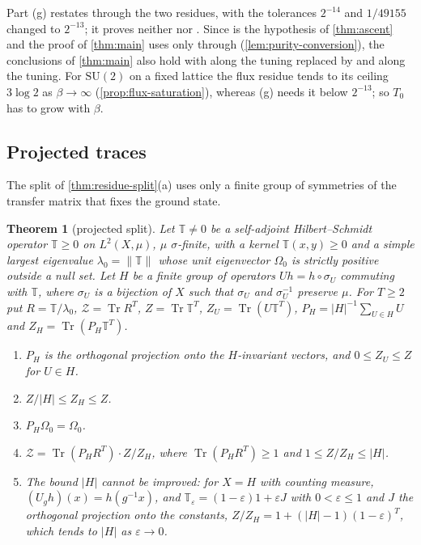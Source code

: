 \documentclass[11pt,a4paper]{amsart}
\newtheorem{theorem}{Theorem}[section]
\theoremstyle{definition}
\theoremstyle{remark}
\numberwithin{equation}{section}
\DeclareMathOperator{\Tr}{Tr}        %
\newcommand{\norm}[1]{\lVert #1\rVert}     %
\newcommand{\abs}[1]{\lvert #1\rvert}      %
\newcommand{\SU}{\mathrm{SU}}              %
\newcommand{\TT}{\mathbb{T}}               %
\newcommand{\Zc}{\mathcal{Z}}              %
\newcommand{\lzero}{\lambda_0}             %
\newcommand{\Omegazero}{\Omega_0}          %
\newcommand{\Mcirc}{\text{\upshape(M$^{\circ}$)}}   %
\newcommand{\Bcirc}{\text{\upshape(B$^{\circ}$)}}   %
\newcommand{\hypN}{\text{\upshape(N)}}              %
\newcommand{\hypP}{\text{\upshape(P)}}              %
\begin{document}
Part (g) restates \Bcirc{} through the two residues, with the tolerances $2^{-14}$ and $1/49155$ changed to $2^{-13}$; it proves neither \hypN{} nor \hypP. Since \Bcirc{} is the hypothesis of \cref{thm:ascent} and the proof of \cref{thm:main} uses \Mcirc{} only through \Bcirc{} (\cref{lem:purity-conversion}), the conclusions of \cref{thm:main} also hold with \Mcirc{} along the tuning replaced by \hypN{} and \hypP{} along the tuning. For $\SU(2)$ on a fixed lattice the flux residue tends to its ceiling $3\log2$ as $\beta\to\infty$ (\cref{prop:flux-saturation}), whereas (g) needs it below $2^{-13}$; so $T_0$ has to grow with $\beta$.

\subsection{Projected traces}

The split of \cref{thm:residue-split}\textup{(a)} uses only a finite group of symmetries of the transfer matrix that fixes the ground state.

\begin{theorem}[projected split]\label{thm:projected-split}
Let $\TT\ne0$ be a self-adjoint Hilbert--Schmidt operator $\TT\ge0$ on $L^2(X,\mu)$, $\mu$ $\sigma$-finite, with a kernel $\TT(x,y)\ge0$ and a simple largest eigenvalue $\lzero=\norm{\TT}$ whose unit eigenvector $\Omegazero$ is strictly positive outside a null set. Let $H$ be a finite group of operators $Uh=h\circ\sigma_U$ commuting with $\TT$, where $\sigma_U$ is a bijection of $X$ such that $\sigma_U$ and $\sigma_U^{-1}$ preserve $\mu$. For $T\ge2$ put $R=\TT/\lzero$, $\Zc=\Tr R^T$, $Z=\Tr\TT^T$, $Z_U=\Tr(U\TT^T)$, $P_H=\abs{H}^{-1}\sum_{U\in H}U$ and $Z_H=\Tr(P_H\TT^T)$.
\begin{enumerate}[label=\textup{(\roman*)},leftmargin=*]
\item $P_H$ is the orthogonal projection onto the $H$-invariant vectors, and $0\le Z_U\le Z$ for $U\in H$.
\item $Z/\abs{H}\le Z_H\le Z$.
\item $P_H\Omegazero=\Omegazero$.
\item $\Zc=\Tr(P_HR^T)\cdot Z/Z_H$, where $\Tr(P_HR^T)\ge1$ and $1\le Z/Z_H\le\abs{H}$.
\item The bound $\abs{H}$ cannot be improved: for $X=H$ with counting measure, $(U_gh)(x)=h(g^{-1}x)$, and $\TT_\varepsilon=(1-\varepsilon)1+\varepsilon J$ with $0<\varepsilon\le1$ and $J$ the orthogonal projection onto the constants, $Z/Z_H=1+(\abs{H}-1)(1-\varepsilon)^T$, which tends to $\abs{H}$ as $\varepsilon\to0$.
\end{enumerate}
\end{theorem}
\end{document}
